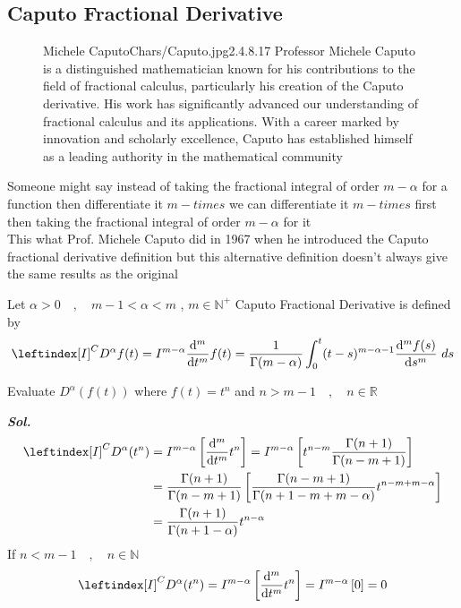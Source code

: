 \subsection{Caputo Fractional Derivative}
\begin{figure*}[b]
    \begin{minipage}[h]{\textwidth}
        \begin{enrichment}{Michele Caputo}{Chars/Caputo.jpg}{2.4}{.8}{.17}
            Professor Michele Caputo is a distinguished mathematician known for his contributions to the field of 
            fractional calculus, particularly his creation of the Caputo derivative$.$ 
            His work has significantly advanced 
            our understanding of fractional calculus and its applications$.$
            With a career marked by innovation and scholarly excellence, 
            Caputo has established himself as a leading authority in the mathematical community
        \end{enrichment} 
    \end{minipage}
\end{figure*}
Someone might say instead of taking the fractional integral of order $m-\alpha$ for a function then differentiate it $m-times$
we can differentiate it $m-times$ first then taking the fractional integral of order $m-\alpha$ for it 
\\
This what Prof$.$ Michele Caputo did in 1967 when he introduced
the Caputo fractional derivative definition
but this alternative definition doesn't always give the same results as the original
\vspace*{.2cm}
\begin{definition}
    Let $\alpha>0 \quad,\quad m-1<\alpha<m$ , $m \in \mathbb{N}^+ $ Caputo Fractional Derivative is defined by    
    \begin{equation}
        \leftindex[I]^C{D^\alpha} f(t) = I^{m-\alpha} \dv[m]{}{t} f(t) =  \frac{1}{\Gamma(m-\alpha)} \int_{0}^{t} (t-s)^{m - \alpha -1}\dv[m]{f(s)}{s} \hquad ds
    \end{equation}
\end{definition}
\begin{example}
    Evaluate $D^{\alpha}(f(t))$ where $f(t) = t^n$ and $n>m-1 \quad,\quad n \in \mathbb{R}$
    
    \textit{ \textbf{Sol.} }
    \begin{align*}
        \leftindex[I]^C {D^{\alpha}} (t^n) &=  I^{m-\alpha}\left[\dv[m]{}{t} t^n \right] =  I^{m-\alpha} \left[ t^{n-m}\frac{\Gamma{(n+1)} } {\Gamma{(n-m+1)} } \right]
        \\
        &=  \frac{\Gamma{(n+1)} } {\Gamma{(n-m+1)} } \left[ \frac{\Gamma{(n-m+1)}}{\Gamma{(n+1-m+m-\alpha)} } t^{n-m+m-\alpha} \right]
        \\
        &=  \frac{\Gamma{(n+1)} }{\Gamma{(n+1-\alpha)} } t^{n-\alpha}
    \end{align*}
    If $n<m-1 \quad,\quad n \in \mathbb{N}$
    \begin{equation}
        \leftindex[I]^C {D^{\alpha}} (t^n) =  I^{m-\alpha}\left[\dv[m]{}{t} t^n \right]=  I^{m-\alpha}\left[0\right]=0    
    \end{equation}
\end{example}
